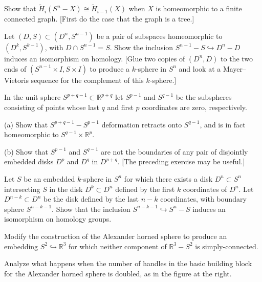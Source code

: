 \begin{exercise}
Show that $\tilde{H}_i(S^n - X) \cong \tilde{H}_{i-1}(X)$ when $X$ is homeomorphic to a finite connected graph. [First do the case that the graph is a tree.]
\end{exercise}

\begin{exercise}
Let $(D, S) \subset (D^n, S^{n-1})$ be a pair of subspaces homeomorphic to $(D^k, S^{k-1})$, with $D \cap S^{n-1} = S$. Show the inclusion $S^{n-1} - S \hookrightarrow D^n - D$ induces an isomorphism on homology. [Glue two copies of $(D^n, D)$ to the two ends of $(S^{n-1} \times I, S \times I)$ to produce a $k$-sphere in $S^n$ and look at a Mayer--Vietoris sequence for the complement of this $k$-sphere.]
\end{exercise}

\begin{exercise}
In the unit sphere $S^{p+q-1} \subset \mathbb{R}^{p+q}$ let $S^{p-1}$ and $S^{q-1}$ be the subspheres consisting of points whose last $q$ and first $p$ coordinates are zero, respectively.

(a) Show that $S^{p+q-1} - S^{p-1}$ deformation retracts onto $S^{q-1}$, and is in fact homeomorphic to $S^{q-1} \times \mathbb{R}^p$.

(b) Show that $S^{p-1}$ and $S^{q-1}$ are not the boundaries of any pair of disjointly embedded disks $D^p$ and $D^q$ in $D^{p+q}$. [The preceding exercise may be useful.]
\end{exercise}

\begin{exercise}
Let $S$ be an embedded $k$-sphere in $S^n$ for which there exists a disk $D^n \subset S^n$ intersecting $S$ in the disk $D^k \subset D^n$ defined by the first $k$ coordinates of $D^n$. Let $D^{n-k} \subset D^n$ be the disk defined by the last $n-k$ coordinates, with boundary sphere $S^{n-k-1}$. Show that the inclusion $S^{n-k-1} \hookrightarrow S^n - S$ induces an isomorphism on homology groups.
\end{exercise}

\begin{exercise}
Modify the construction of the Alexander horned sphere to produce an embedding $S^2 \hookrightarrow \mathbb{R}^3$ for which neither component of $\mathbb{R}^3 - S^2$ is simply-connected.
\end{exercise}

\begin{exercise}
Analyze what happens when the number of handles in the basic building block for the Alexander horned sphere is doubled, as in the figure at the right.
\end{exercise}

